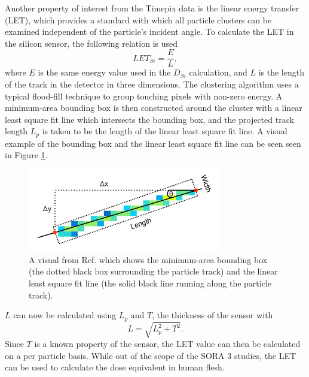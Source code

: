 Another property of interest from the Timepix data is the linear energy transfer (LET), which provides a standard with which all particle clusters can be examined independent of the particle's incident angle.
To calculate the LET in the silicon sensor, the following relation is used
\begin{equation*}
  LET_{Si} = \dfrac{E}{L},
\end{equation*}
where $E$ is the same energy value used in the $D_{Si}$ calculation, and $L$ is the length of the track in the detector in three dimensions.
The clustering algorithm uses a typical flood-fill technique to group touching pixels with non-zero energy.
A minimum-area bounding box is then constructed around the cluster with a linear least square fit line which intersects the bounding box, and the projected track length $L_p$ is taken to be the length of the linear least square fit line.
A visual example of the bounding box and the linear least square fit line can be seen seen in Figure \ref{fig:stuart-track-example}.
\begin{figure}[h!]
	\begin{center}
		\includegraphics[width=0.75\textwidth]{figures/stuart-track-example.png}
		\caption{A visual from Ref. \cite{Stuart-Thesis} which shows the minimum-area bounding box (the dotted black box surrounding the particle track) and the linear least square fit line (the solid black line running along the particle track).}
		\label{fig:stuart-track-example}
	\end{center}
\end{figure}
$L$ can now be calculated using $L_p$ and $T$, the thickness of the sensor with
\begin{equation*}
  L = \sqrt{L_p^2 + T^2}.
\end{equation*}
Since $T$ is a known property of the sensor, the LET value can then be calculated on a per particle basis.
While out of the scope of the SORA 3 studies, the LET can be used to calculate the dose equivalent in human flesh.

